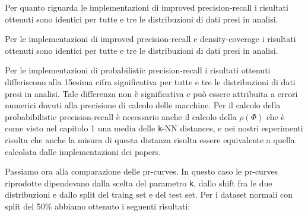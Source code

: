 Per quanto riguarda le implementazioni di improved precision-recall \cite{2ImprovedPrecisionRecall} i risultati ottenuti sono identici per tutte e tre le distribuzioni di dati presi in analisi.

Per le implementazioni di improved precision-recall e density-coverage \cite{3ReliableFidelityDiversityMetrics} i risultati ottenuti sono identici per tutte e tre le distribuzioni di dati presi in analisi.

Per le implementazioni di probabilistic precision-recall \cite{4ProbabilisticPrecisionRecall} i risultati ottenuti differiscono alla 15esima cifra significativa per tutte e tre le distribuzioni di dati presi in analisi.
Tale differenza non è significativa e può essere attribuita a errori numerici dovuti alla precisione di calcolo delle macchine. Per il calcolo della probabibilistic precision-recall è necessario anche il calcolo della \(\rho(\Phi)\) che è come visto nel capitolo 1 una media delle \texttt{k}-NN distances,
e nei nostri esperimenti risulta che anche la misura di questa distanza risulta essere equivalente a quella calcolata dalle implementazioni dei papers.

Passiamo ora alla comparazione delle pr-curves. In questo caso le pr-curves riprodotte dipendevano dalla scelta del parametro \texttt{k}, dallo shift fra le due distribuzioni e dallo split del traing set e del test set.
Per i dataset normali con split del 50\% abbiamo ottenuto i seguenti risultati:

